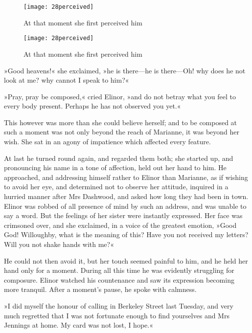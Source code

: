 \begin{a4}
	\begin{figure}[tbph]
		\centering
		\texttt{[image: 28perceived]}
		\caption{At that moment she first perceived him}
	\end{figure}	
\end{a4}

\begin{letter}
	\begin{figure}[tbph]
		\centering
		\texttt{[image: 28perceived]}
		\caption{At that moment she first perceived him}
	\end{figure}
\end{letter}

»Good heavens!« she exclaimed, »he is there—he is there—Oh! why does he not look at me? why cannot I speak to him?«

»Pray, pray be composed,« cried Elinor, »and do not betray what you feel to every body present. Perhaps he has not observed you yet.«

This however was more than she could believe herself; and to be composed at such a moment was not only beyond the reach of Marianne, it was beyond her wish. She sat in an agony of impatience which affected every feature.

At last he turned round again, and regarded them both; she started up, and pronouncing his name in a tone of affection, held out her hand to him. He approached, and addressing himself rather to Elinor than Marianne, as if wishing to avoid her eye, and determined not to observe her attitude, inquired in a hurried manner after Mrs Dashwood, and asked how long they had been in town. Elinor was robbed of all presence of mind by such an address, and was unable to say a word. But the feelings of her sister were instantly expressed. Her face was crimsoned over, and she exclaimed, in a voice of the greatest emotion, »Good God! Willoughby, what is the meaning of this? Have you not received my letters? Will you not shake hands with me?«

He could not then avoid it, but her touch seemed painful to him, and he held her hand only for a moment. During all this time he was evidently struggling for composure. Elinor watched his countenance and saw its expression becoming more tranquil. After a moment’s pause, he spoke with calmness.

»I did myself the honour of calling in Berkeley Street last Tuesday, and very much regretted that I was not fortunate enough to find yourselves and Mrs Jennings at home. My card was not lost, I hope.«

